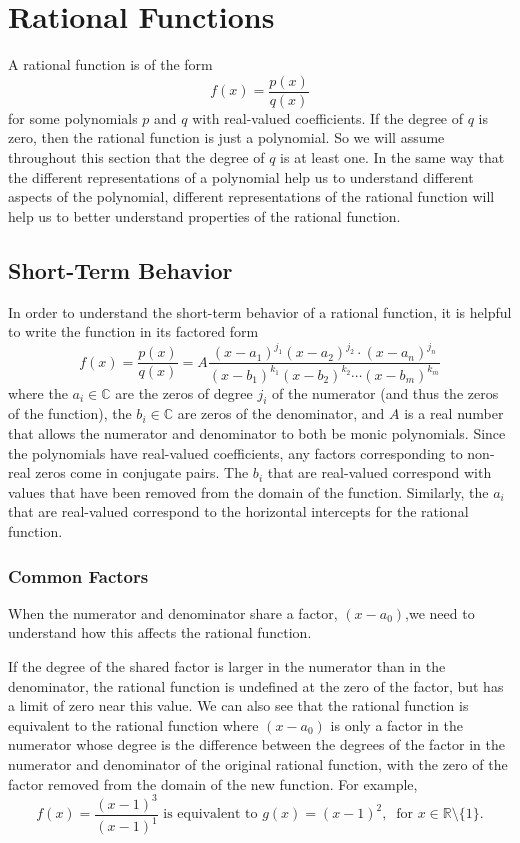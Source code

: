 \documentclass[
]{book}
\theoremstyle{definition}
\theoremstyle{definition}
\theoremstyle{definition}
\theoremstyle{definition}
\theoremstyle{remark}
\begin{document}
\hypertarget{sec:rational-functions}{%
\section{Rational Functions}\label{sec:rational-functions}}

A rational function is of the form
\[f(x)=\frac{p(x)}{q(x)}\] for some polynomials \(p\) and \(q\) with real-valued coefficients. If the degree of \(q\) is zero, then the rational function is just a polynomial. So we will assume throughout this section that the degree of \(q\) is at least one. In the same way that the different representations of a polynomial help us to understand different aspects of the polynomial, different representations of the rational function will help us to better understand properties of the rational function.

\hypertarget{short-term-behavior-1}{%
\subsection{Short-Term Behavior}\label{short-term-behavior-1}}

In order to understand the short-term behavior of a rational function, it is helpful to write the function in its factored form
\[f(x)=\frac{p(x)}{q(x)} = A\frac{ (x-a_1)^{j_1} (x-a_2)^{j_2} \cdot (x-a_n)^{j_n}}{(x-b_1)^{k_1} (x-b_2)^{k_2} \cdots (x-b_m)^{k_m}}\] where the \(a_i\in \mathbb{C}\) are the zeros of degree \(j_i\) of the numerator (and thus the zeros of the function), the \(b_i\in \mathbb{C}\) are zeros of the denominator, and \(A\) is a real number that allows the numerator and denominator to both be monic polynomials. Since the polynomials have real-valued coefficients, any factors corresponding to non-real zeros come in conjugate pairs. The \(b_i\) that are real-valued correspond with values that have been removed from the domain of the function. Similarly, the \(a_i\) that are real-valued correspond to the horizontal intercepts for the rational function.

\hypertarget{common-factors}{%
\subsubsection{Common Factors}\label{common-factors}}

When the numerator and denominator share a factor, \((x-a_0)\),we need to understand how this affects the rational function.

If the degree of the shared factor is larger in the numerator than in the denominator, the rational function is undefined at the zero of the factor, but has a limit of zero near this value. We can also see that the rational function is equivalent to the rational function where \((x-a_0)\) is only a factor in the numerator whose degree is the difference between the degrees of the factor in the numerator and denominator of the original rational function, with the zero of the factor removed from the domain of the new function. For example,
\[f(x)=\frac{(x-1)^3}{(x-1)^1} \mbox{ is equivalent to } g(x)=(x-1)^2, \: \mbox{ for } x\in \mathbb{R}\setminus\{1\}.\]
\end{document}

